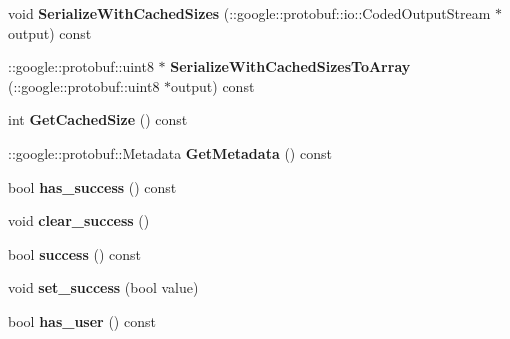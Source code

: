 \begin{DoxyCompactItemize}
\item 
\hypertarget{classSimpleChat_1_1UserJoinResponse_a6efd7ade0c5cda0fd19d22333d613e66}{void {\bfseries Serialize\-With\-Cached\-Sizes} (\-::google\-::protobuf\-::io\-::\-Coded\-Output\-Stream $\ast$output) const }\label{classSimpleChat_1_1UserJoinResponse_a6efd7ade0c5cda0fd19d22333d613e66}

\item 
\hypertarget{classSimpleChat_1_1UserJoinResponse_a997ba4d2a92b010fd02f3cef8ca99f1d}{\-::google\-::protobuf\-::uint8 $\ast$ {\bfseries Serialize\-With\-Cached\-Sizes\-To\-Array} (\-::google\-::protobuf\-::uint8 $\ast$output) const }\label{classSimpleChat_1_1UserJoinResponse_a997ba4d2a92b010fd02f3cef8ca99f1d}

\item 
\hypertarget{classSimpleChat_1_1UserJoinResponse_a4c34493152ee3e2bd48ab9f778cd39e2}{int {\bfseries Get\-Cached\-Size} () const }\label{classSimpleChat_1_1UserJoinResponse_a4c34493152ee3e2bd48ab9f778cd39e2}

\item 
\hypertarget{classSimpleChat_1_1UserJoinResponse_a7cb0a528f8cade7293c587972d9e654d}{\-::google\-::protobuf\-::\-Metadata {\bfseries Get\-Metadata} () const }\label{classSimpleChat_1_1UserJoinResponse_a7cb0a528f8cade7293c587972d9e654d}

\item 
\hypertarget{classSimpleChat_1_1UserJoinResponse_a85eac5829d72c9b8bba643392109b20a}{bool {\bfseries has\-\_\-success} () const }\label{classSimpleChat_1_1UserJoinResponse_a85eac5829d72c9b8bba643392109b20a}

\item 
\hypertarget{classSimpleChat_1_1UserJoinResponse_a314674c3b695b99fa6205b529c12b4b1}{void {\bfseries clear\-\_\-success} ()}\label{classSimpleChat_1_1UserJoinResponse_a314674c3b695b99fa6205b529c12b4b1}

\item 
\hypertarget{classSimpleChat_1_1UserJoinResponse_ab1429a2461ce6875ee6fc9d28814b4ae}{bool {\bfseries success} () const }\label{classSimpleChat_1_1UserJoinResponse_ab1429a2461ce6875ee6fc9d28814b4ae}

\item 
\hypertarget{classSimpleChat_1_1UserJoinResponse_a91027dd2f3e2e44cfdee454cffc07f6c}{void {\bfseries set\-\_\-success} (bool value)}\label{classSimpleChat_1_1UserJoinResponse_a91027dd2f3e2e44cfdee454cffc07f6c}

\item 
\hypertarget{classSimpleChat_1_1UserJoinResponse_a0d883988b11d1698911f271e73f84e84}{bool {\bfseries has\-\_\-user} () const }\label{classSimpleChat_1_1UserJoinResponse_a0d883988b11d1698911f271e73f84e84}


\end{DoxyCompactItemize}
